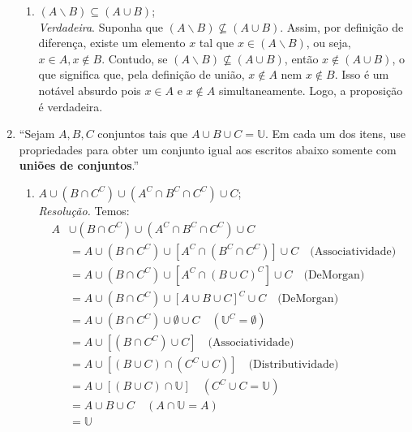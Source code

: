 \documentclass[13pt,letterpaper]{article}
\begin{document}
\begin{enumerate}
\begin{enumerate}
        \item $(A \backslash B) \subseteq (A \cup B)$; \\
        \emph{Verdadeira}. 
        Suponha que $(A \backslash B) \nsubseteq (A \cup B)$. Assim, por definição de diferença, existe um elemento $x$ tal que $x \in (A \backslash B)$, ou seja, $x \in A, x \notin B$. Contudo, se $(A \backslash B) \nsubseteq (A \cup B)$, então $x \notin (A \cup B)$, o que significa que, pela definição de união, $x \notin A \text{ nem } x \notin B$. Isso é um notável absurdo pois $x \in A$ e $x \notin A$ simultaneamente. Logo, a proposição é verdadeira.
    \end{enumerate}
    \item \enquote{Sejam $A, B, C$ conjuntos tais que $A \cup B \cup C = \mathbb{U}$. Em cada um dos itens, use propriedades para obter um conjunto igual aos escritos abaixo somente com \textbf{uniões de conjuntos}.}
    \begin{enumerate}
        \item $A \cup (B \cap C^C) \cup (A^C \cap B^C \cap C^C) \cup C$; \\
        \emph{Resolução.} Temos:
        \begin{align*}
           A &\cup (B \cap C^C) \cup (A^C \cap B^C \cap C^C) \cup C \\ &=
           A \cup (B \cap C^C) \cup [A^C \cap (B^C \cap C^C)] \cup C \quad \text{(Associatividade)} \\ &=
           A \cup (B \cap C^C) \cup [A^C \cap (B \cup C)^C] \cup C \quad \text{(DeMorgan)} \\ &=
           A \cup (B \cap C^C) \cup [A \cup B \cup C]^C \cup C \quad \text{(DeMorgan)} \\ &=
           A \cup (B \cap C^C) \cup \emptyset \cup C \quad (\mathbb{U}^C = \emptyset) \\ &= 
           A \cup [(B \cap C^C) \cup C] \quad \text{(Associatividade)} \\ &=
           A \cup [(B \cup C) \cap (C^C \cup C)] \quad \text{(Distributividade)} \\ &=
           A \cup [(B \cup C) \cap \mathbb{U}] \quad (C^C \cup C = \mathbb{U}) \\ &=
           A \cup B \cup C \quad (A \cap \mathbb{U} = A) \\ &=
           \mathbb{U}

\end{align*}
\end{enumerate}
\end{enumerate}
\end{document}
